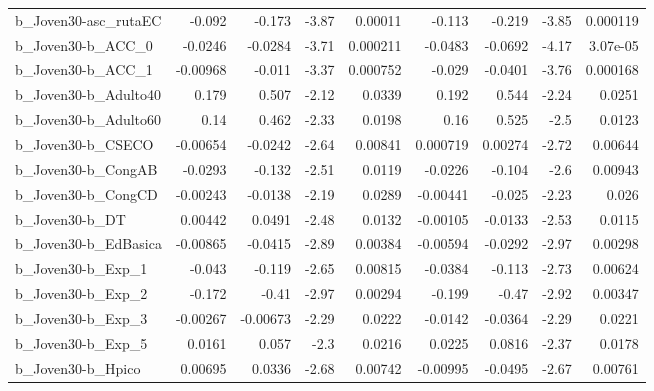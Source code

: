 \begin{tabular}{lrrrrrrrr}
b\_Joven30-asc\_rutaEC       &      -0.092 &       -0.173 &     -3.87 &  0.00011 &     -0.113 &      -0.219 &        -3.85 &      0.000119 \\
b\_Joven30-b\_ACC\_0          &     -0.0246 &      -0.0284 &     -3.71 & 0.000211 &    -0.0483 &     -0.0692 &        -4.17 &      3.07e-05 \\
b\_Joven30-b\_ACC\_1          &    -0.00968 &       -0.011 &     -3.37 & 0.000752 &     -0.029 &     -0.0401 &        -3.76 &      0.000168 \\
b\_Joven30-b\_Adulto40       &       0.179 &        0.507 &     -2.12 &   0.0339 &      0.192 &       0.544 &        -2.24 &        0.0251 \\
b\_Joven30-b\_Adulto60       &        0.14 &        0.462 &     -2.33 &   0.0198 &       0.16 &       0.525 &         -2.5 &        0.0123 \\
b\_Joven30-b\_CSECO          &    -0.00654 &      -0.0242 &     -2.64 &  0.00841 &   0.000719 &     0.00274 &        -2.72 &       0.00644 \\
b\_Joven30-b\_CongAB         &     -0.0293 &       -0.132 &     -2.51 &   0.0119 &    -0.0226 &      -0.104 &         -2.6 &       0.00943 \\
b\_Joven30-b\_CongCD         &    -0.00243 &      -0.0138 &     -2.19 &   0.0289 &   -0.00441 &      -0.025 &        -2.23 &         0.026 \\
b\_Joven30-b\_DT             &     0.00442 &       0.0491 &     -2.48 &   0.0132 &   -0.00105 &     -0.0133 &        -2.53 &        0.0115 \\
b\_Joven30-b\_EdBasica       &    -0.00865 &      -0.0415 &     -2.89 &  0.00384 &   -0.00594 &     -0.0292 &        -2.97 &       0.00298 \\
b\_Joven30-b\_Exp\_1          &      -0.043 &       -0.119 &     -2.65 &  0.00815 &    -0.0384 &      -0.113 &        -2.73 &       0.00624 \\
b\_Joven30-b\_Exp\_2          &      -0.172 &        -0.41 &     -2.97 &  0.00294 &     -0.199 &       -0.47 &        -2.92 &       0.00347 \\
b\_Joven30-b\_Exp\_3          &    -0.00267 &     -0.00673 &     -2.29 &   0.0222 &    -0.0142 &     -0.0364 &        -2.29 &        0.0221 \\
b\_Joven30-b\_Exp\_5          &      0.0161 &        0.057 &      -2.3 &   0.0216 &     0.0225 &      0.0816 &        -2.37 &        0.0178 \\
b\_Joven30-b\_Hpico          &     0.00695 &       0.0336 &     -2.68 &  0.00742 &   -0.00995 &     -0.0495 &        -2.67 &       0.00761 \\

\end{tabular}
